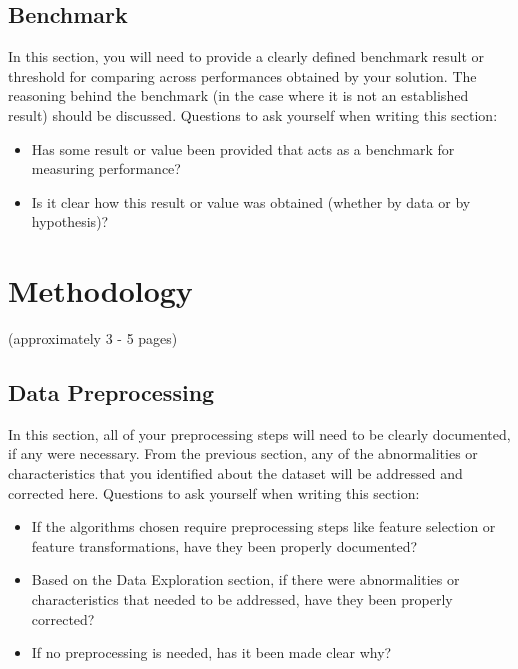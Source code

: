 \documentclass[twoside,openright,titlepage,numbers=noenddot,headinclude,%
               footinclude=true,cleardoublepage=empty,abstractoff,BCOR=5mm,%
               paper=a4,fontsize=11pt,ngerman,american]{scrreprt}
\numberwithin{theorem}{chapter}
\numberwithin{definition}{chapter}
\numberwithin{algorithm}{chapter}
\numberwithin{figure}{chapter}
\numberwithin{table}{chapter}
\numberwithin{equation}{chapter}
\begin{document}
\section*{Benchmark}

In this section, you will need to provide a clearly defined benchmark result or threshold for comparing across performances obtained by your solution. The reasoning behind the benchmark (in the case where it is not an established result) should be discussed. Questions to ask yourself when writing this section:
\begin{itemize}%
\item Has some result or value been provided that acts as a benchmark for measuring performance?
\item Is it clear how this result or value was obtained (whether by data or by hypothesis)?
\end{itemize}

\chapter*{Methodology}

(approximately 3 - 5 pages)

\section*{Data Preprocessing}
In this section, all of your preprocessing steps will need to be clearly documented, if any were necessary. From the previous section, any of the abnormalities or characteristics that you identified about the dataset will be addressed and corrected here. Questions to ask yourself when writing this section:
\begin{itemize}%
\item If the algorithms chosen require preprocessing steps like feature selection or feature transformations, have they been properly documented?
\item Based on the Data Exploration section, if there were abnormalities or characteristics that needed to be addressed, have they been properly corrected?
\item If no preprocessing is needed, has it been made clear why?
\end{itemize}
\end{document}
